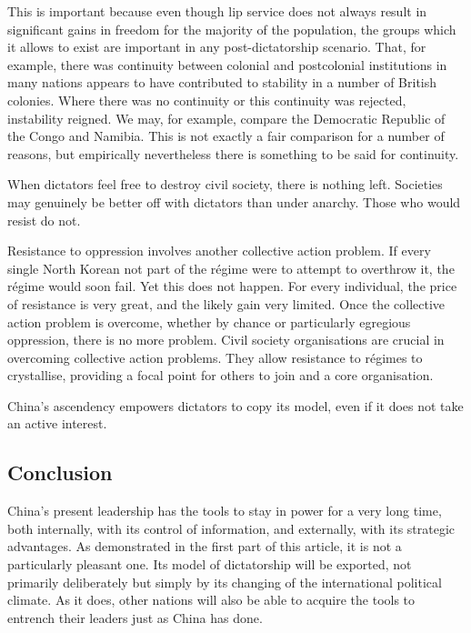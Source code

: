 \documentclass[11pt,a4paper]{report}
\begin{document}
\begin{multicols}{2}
This is important because even though lip service does not always result
in significant gains in freedom for the majority of the population, the
groups which it allows to exist are important in any post-dictatorship
scenario. That, for example, there was continuity between colonial and
postcolonial institutions in many nations appears to have contributed to
stability in a number of British colonies. Where there was no continuity
or this continuity was rejected, instability reigned. We may, for
example, compare the Democratic Republic of the Congo and Namibia. This
is not exactly a fair comparison for a number of reasons, but
empirically nevertheless there is something to be said for continuity.

When dictators feel free to destroy civil society, there is nothing
left. Societies may genuinely be better off with dictators than under
anarchy. Those who would resist do not.

Resistance to oppression involves another collective action problem. If
every single North Korean not part of the régime were to attempt to
overthrow it, the régime would soon fail. Yet this does not happen. For
every individual, the price of resistance is very great, and the likely
gain very limited. Once the collective action problem is overcome,
whether by chance or particularly egregious oppression, there is no more
problem. Civil society organisations are crucial in overcoming
collective action problems. They allow resistance to régimes to
crystallise, providing a focal point for others to join and a core
organisation.

China's ascendency empowers dictators to copy its model, even if it does
not take an active interest.

\end{multicols}

\subsection{Conclusion}\label{conclusion}

\begin{multicols}{2}

China's present leadership has the tools to stay in power for a very
long time, both internally, with its control of information, and
externally, with its strategic advantages. As demonstrated in the first
part of this article, it is not a particularly pleasant one. Its model
of dictatorship will be exported, not primarily deliberately but simply
by its changing of the international political climate. As it does,
other nations will also be able to acquire the tools to entrench their
leaders just as China has done.

\end{multicols}
\end{document}
